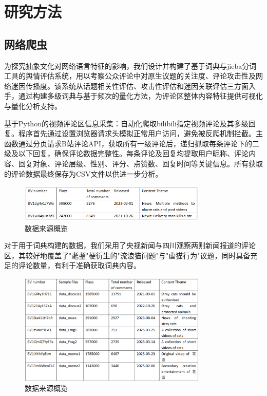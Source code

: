 \documentclass[12pt,a4paper]{ctexart}
\begin{document}
\section{研究方法}


\subsection{网络爬虫}

为探究抽象文化对网络语言特征的影响，我们设计并构建了基于词典与jieba分词工具的舆情评估系统，用以考察公众评论中对原生议题的关注度、评论攻击性及网络迷因传播度。该系统从话题相关性评估、攻击性评估和迷因关联评估三方面入手，通过构建多级词典与基于频次的量化方法，为评论区整体内容特征提供可视化与量化分析支持。

基于Python的视频评论区信息采集：自动化爬取bilibili指定视频评论及其多级回复。程序首先通过设置浏览器请求头模拟正常用户访问，避免被反爬机制拦截。主函数通过分页请求B站评论API，获取所有一级评论后，递归抓取每条评论下的二级及以下回复，确保评论数据完整性。每条评论及回复均提取用户昵称、评论内容、回复对象、评论层级、性别、评分、点赞数、回复时间等关键信息。所有获取的评论数据最终保存为CSV文件以供进一步分析。

\begin{figure}[htbp]
    \centering
    \includegraphics[width=0.8\textwidth]{img/data_sources_1.png}
    \caption{数据来源概览}
    \label{fig:data_sources_1}
\end{figure}
\newpage

对于用于词典构建的数据，我们采用了央视新闻与四川观察两则新闻报道的评论区，其较好地覆盖了"耄耋"梗衍生的"流浪猫问题"与"虐猫行为"议题，同时具备充足的评论数量，有利于准确获取词典内容。

\begin{figure}[htbp]
    \centering
    \includegraphics[width=0.8\textwidth]{img/data_sources_2.png}
    \caption{数据来源概览}
    \label{fig:data_sources_2}
\end{figure}
\newpage
\end{document}
